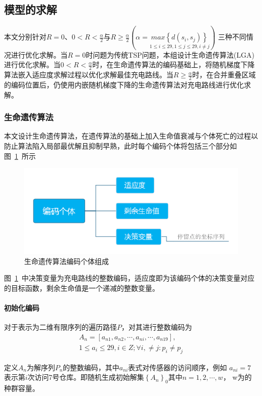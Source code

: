 \documentclass{whutmod}
\begin{document}
\begin{table}[H]
\begin{tablenotes}
		\subsection{模型的求解}
		本文分别针对$R=0$、$0<R<\frac{\alpha }{2}$与$R\geqslant\frac{\alpha }{2} (\alpha =\underset{1\leqslant i\leqslant 29,1\leqslant j\leqslant 29,i\neq j}{max\left \{ d(s_i,s_j) \right \}}) $
		三种不同情况进行优化求解。当$R=0$时问题为传统TSP问题，本组设计生命遗传算法(LGA)进行优化求解。当$0<R<\frac{\alpha }{2}$时，在生命遗传算法的编码基础上，将随机梯度下降算法嵌入适应度求解过程以优化求解最佳充电路线。当$R\geqslant\frac{\alpha }{2}$时，在合并重叠区域的编码位置后，仍使用内嵌随机梯度下降的生命遗传算法对充电路线进行优化求解。
		
		\subsubsection{生命遗传算法}
		本文设计生命遗传算法，在遗传算法的基础上加入生命值衰减与个体死亡的过程以防止算法陷入局部最优解且抑制早熟，此时每个编码个体将包括三个部分如图~\ref{saf}~所示
		\begin{figure}[H]
			\centering
			\includegraphics[width=.8\textwidth]{figures/lga.png}
			\caption{生命遗传算法编码个体组成}\label{saf}
		\end{figure}
		
		图~\ref{saf}~中决策变量为充电路线的整数编码，适应度即为该编码个体的决策变量对应的目标函数，剩余生命值是一个递减的整数变量。
		 \paragraph{初始化编码}
		对于表示为二维有限序列的遍历路径$P$，对其进行整数编码为
		\begin{gather*}
		A_n=[a_{n1},a_{n2},\cdots,a_{ni},\cdots,a_{n19}], \\
		1\leqslant a_i \leqslant 29 ,i\in Z ;\forall i, \neq j:p_i \neq p_j 
		\end{gather*}
		
		定义$A_n$为解序列$P_{n}$的整数编码，其中$a_{ni}$表式对传感器的访问顺序，例如 $a_{ni}=7$表示第$i$次访问7号仓库。即随机生成初始解集$\left \{A_n\right \}_0$其中$n=1,2,\cdots,w$， w为的种群容量。
		

\end{tablenotes}
\end{table}
\end{document}
